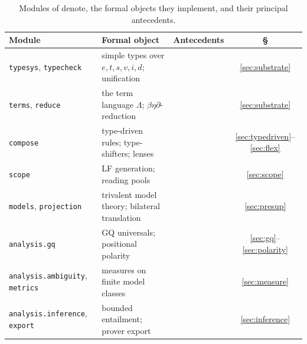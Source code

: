 \documentclass[11pt,a4paper]{article}
\newcommand{\dn}{\textsf{denote}}
\newcommand{\cmd}[1]{\texttt{#1}}
\theoremstyle{definition}
\begin{document}
\begin{table}[t]\centering\small
\caption{Modules of \dn{}, the formal objects they implement, and their principal antecedents.}\label{tab:modules}
\begin{tabularx}{\textwidth}{@{}lLLc@{}}
\toprule
Module & Formal object & Antecedents & \S\\
\midrule
\cmd{typesys}, \cmd{typecheck} & simple types over $e,t,s,v,i,d$; unification & \citet{church1940,gallin1975,hindley1969,milner1978} & \ref{sec:substrate}\\
\cmd{terms}, \cmd{reduce} & the term language $\Lambda$; $\beta\eta\partial$-reduction & \citet{church1936,churchrosser1936,tait1967,debruijn1972} & \ref{sec:substrate}\\
\cmd{compose} & type-driven rules; type-shifters; lenses & \citet{kleinsag1985,heimkratzer1998,partee1987,hendriks1993} & \ref{sec:typedriven}--\ref{sec:flex}\\
\cmd{scope} & LF generation; reading pools & \citet{may1977,cooper1983,barker2002} & \ref{sec:scope}\\
\cmd{models}, \cmd{projection} & trivalent model theory; bilateral translation & \citet{kleene1952,peters1979,karttunen1974,kripke1975} & \ref{sec:presup}\\
\cmd{analysis.gq} & GQ universals; positional polarity & \citet{barwisecooper1981,keenanstavi1986,vanbenthem1986,ladusaw1979} & \ref{sec:gq}--\ref{sec:polarity}\\
\cmd{analysis.ambiguity}, \cmd{metrics} & measures on finite model classes & \citet{carnap1950,carnapbarhillel1952,fagin1976} & \ref{sec:measure}\\
\cmd{analysis.inference}, \cmd{export} & bounded entailment; prover export & \citet{cooperetal1996,blackburnbos2005,sutcliffe2009} & \ref{sec:inference}\\
\bottomrule
\end{tabularx}
\end{table}
\end{document}

